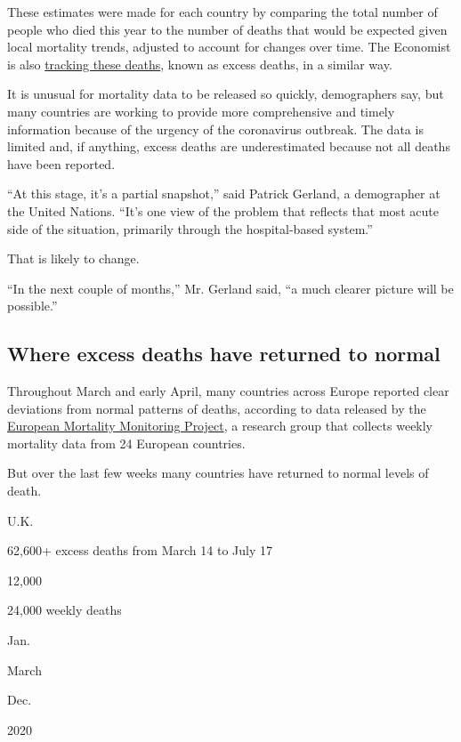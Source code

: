 These estimates were made for each country by comparing the total number
of people who died this year to the number of deaths that would be
expected given local mortality trends, adjusted to account for changes
over time. The Economist is also
\href{https://www.economist.com/graphic-detail/2020/04/16/tracking-covid-19-excess-deaths-across-countries}{tracking
these deaths}, known as excess deaths, in a similar way.

It is unusual for mortality data to be released so quickly, demographers
say, but many countries are working to provide more comprehensive and
timely information because of the urgency of the coronavirus outbreak.
The data is limited and, if anything, excess deaths are underestimated
because not all deaths have been reported.

``At this stage, it's a partial snapshot,'' said Patrick Gerland, a
demographer at the United Nations. ``It's one view of the problem that
reflects that most acute side of the situation, primarily through the
hospital-based system.''

That is likely to change.

``In the next couple of months,'' Mr. Gerland said, ``a much clearer
picture will be possible.''

\hypertarget{where-excess-deaths-have-returned-to-normal}{%
\subsection{Where excess deaths have returned to
normal}\label{where-excess-deaths-have-returned-to-normal}}

Throughout March and early April, many countries across Europe reported
clear deviations from normal patterns of deaths, according to data
released by the
\href{https://www.euromomo.eu/outputs/zscore_country_total.html}{European
Mortality Monitoring Project}, a research group that collects weekly
mortality data from 24 European countries.

But over the last few weeks many countries have returned to normal
levels of death.

U.K.

62,600+ excess deaths from March 14 to July 17

12,000

24,000 weekly deaths

Jan.

March

Dec.

2020

